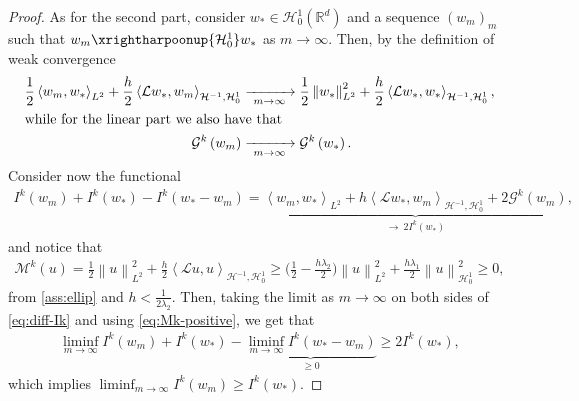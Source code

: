 \documentclass[11pt,a4paper,reqno]{amsart}
\numberwithin{equation}{section}
\theoremstyle{plain}
\theoremstyle{definition}
\newcommand{\ip}[1]{\left\langle#1\right\rangle}
\newcommand{\tsigma}{\tilde \sigma }
\newcommand{\cL}{\mathcal{L}}
\newcommand{\cH}{\mathcal{H}}
\newcommand{\R}{\mathbb{R}}
\newcommand{\norm}[1]{\left\|#1 \right\|} %
\begin{document}
\begin{proof}
As for the second part, consider $w_*\in \cH_0^1(\R^d)$ and a sequence $(w_m)_m$ such that $w_m \xrightharpoonup{\mathcal{H}_0^1} w_*$ as $m\to\infty$.
Then, by the definition of weak convergence
\begin{align*}
\frac{1}{2} \ip{w_m, w_*}_{L^2} + \frac{h}{2} \ip{\cL  w_*, w_m}_{\cH^{-1},\cH_0^1} &\xrightarrow[\ m\to\infty\ ]{} \frac{1}{2} \norm{w_*}^2_{L^2} + \frac{h}{2}  \ip{\cL  w_*,  w_*}_{\cH^{-1},\cH_0^1}, \\ 
\intertext{while for the linear part we also have that} 
\mathcal{G}^k \left( w_m \right) &\xrightarrow[\ m\to\infty\ ]{} \mathcal{G}^k \left( w_* \right) .
\end{align*}
Consider now the functional
\begin{align}\label{eq:diff-Ik}
I^k \left( w_m \right) + I^k \left( w_* \right) - I^k \left( w_* - w_m \right) 
    = \underbrace{\ip{w_m, w_*}_{L^2} + h \ip{\cL  w_*,  w_m}_{\cH^{-1},\cH_0^1} + 2 \mathcal{G}^k \left( w_m \right)}_{\longrightarrow \ 2 I^k \left( w_* \right)},
\end{align}
and notice that 
\begin{align}\label{eq:Mk-positive}
\mathcal{M}^k (u)  = \frac{1}{2} \norm{u}^2_{L^2} + \frac{h}{2} \ip{\cL  u,  u}_{\cH^{-1},\cH_0^1}\ge \Big(\frac{1}{2}-\frac{h \lambda_2}{2}\Big) \norm{u}^2_{L^2} + \frac{h\lambda_1}{2} \norm{u}^2_{\cH_0^1}\ge 0,
\end{align}
from \cref{ass:ellip} and $h<\frac{1}{2\lambda_2}$.
Then, taking the limit as $m \to \infty$ on both sides of \eqref{eq:diff-Ik} and using \eqref{eq:Mk-positive}, we get that
\begin{align*}
\liminf_{m \to \infty} I^k \left( w_m \right) + I^k \left( w_* \right) - \underbrace{\liminf_{m \to \infty} I^k \left( w_* - w_m \right)}_{ \ge 0} \ge 2 I^k \left( w_* \right),
\end{align*}
which implies $\liminf_{m \to \infty} I^k \left( w_m \right) \ge I^k \left( w_* \right)$. 
\end{proof}
\end{document}

